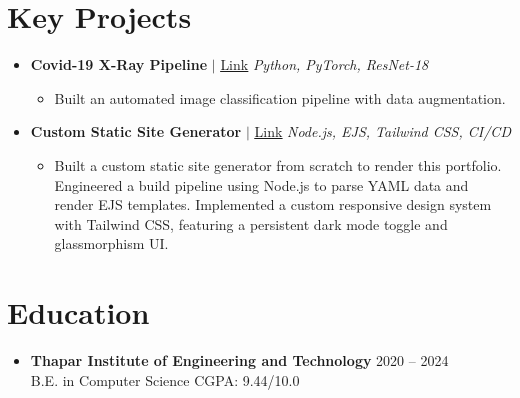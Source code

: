 \documentclass[a4paper,10pt]{article}
\newcommand{\projectHeading}[3]{
    \textbf{#1} $|$ \href{#2}{\underline{Link}} \hfill \textit{\small #3} \\
}
\newcommand{\resumeItem}[1]{\item\small{#1}}
\begin{document}
\section{Key Projects}
\begin{itemize}[leftmargin=0.15in, label={}]
    
    \item
        \projectHeading
            {Covid-19 X-Ray Pipeline}
            {https://github.com/PRAJJWALmehta/Machine-Learning-/tree/main/Covid-19\%20detection\%20from\%20X-ray\%20images\%20using\%20ResNet-18} 
            {Python, PyTorch, ResNet-18}
            
        \begin{itemize}[leftmargin=0.2in, topsep=0pt, partopsep=0pt]
            
                \resumeItem{Built an automated image classification pipeline with data augmentation.}
            
            
        \end{itemize}
        \vspace{8pt} 
    
    \item
        \projectHeading
            {Custom Static Site Generator}
            {https://github.com/PRAJJWALmehta/my-portfolio} 
            {Node.js, EJS, Tailwind CSS, CI/CD}
            
        \begin{itemize}[leftmargin=0.2in, topsep=0pt, partopsep=0pt]
            
                \resumeItem{Built a custom static site generator from scratch to render this portfolio. Engineered a build pipeline using Node.js to parse YAML data and render EJS templates. Implemented a custom responsive design system with Tailwind CSS, featuring a persistent dark mode toggle and glassmorphism UI.}
            
            
        \end{itemize}
        \vspace{8pt} 
    
\end{itemize}

\section{Education}
\begin{itemize}[leftmargin=0.15in, label={}]
    
    \item
        \textbf{Thapar Institute of Engineering and Technology} \hfill 
        2020 -- 2024 \\
        B.E. in Computer Science \hfill CGPA: 9.44/10.0
    
\end{itemize}
\end{document}
